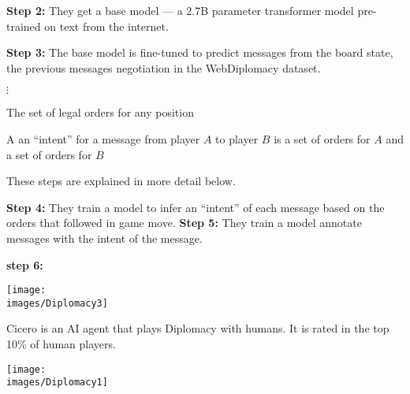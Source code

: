 {\vfill
{\bf Step 2:} They get a base model --- a 2.7B parameter transformer
model pre-trained on text from the internet.

\vfill
{\bf Step 3:} The base model is fine-tuned to predict messages from the board state, the previous messages negotiation in the WebDiplomacy dataset.

\vfill
$\vdots$


The set of legal orders for any position 

A an ``intent'' for a message from player $A$ to player $B$ is a set of orders for $A$ and a set of orders for $B$ 

These steps are explained in more detail below.

\vfill
{\bf Step 4:} They train a model to infer an ``intent'' of each message based on the orders that followed in game move.
\vfill
{\bf Step 5:} They train a model annotate messages with the intent of the message.

\vfill
{\bf step 6:} 


\centerline{\texttt{[image: \\images/Diplomacy3]}}



Cicero is an AI agent that plays Diplomacy with humans.  It is rated in the top 10\% of human players.

\vfill

\centerline{\texttt{[image: \\images/Diplomacy1]}}



}

